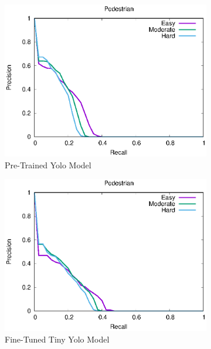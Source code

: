 \begin{figure}[H]
\begin{subfigure}{.34\textwidth}
    \centering
    \includegraphics[width=1.0\linewidth]{img/yolo_Nov_4/plot_valid/pedestrian_detection.eps}
    \caption{Pre-Trained Yolo Model}
\end{subfigure}%
\begin{subfigure}{.34\textwidth}
    \centering
    \includegraphics[width=1.0\linewidth]{img/yolo_Nov_9/plot_valid/pedestrian_detection.eps}
    \caption{Fine-Tuned Tiny Yolo Model}
\end{subfigure}%
\begin{subfigure}{.34\textwidth}
    \centering

\end{subfigure}
\end{figure}
